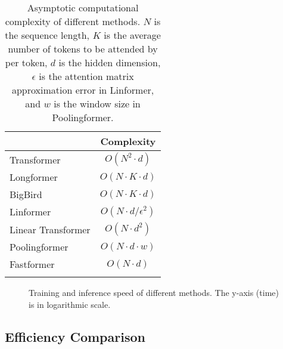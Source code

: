 \documentclass[11pt,a4paper]{article}
\begin{document}
\begin{table}[t]
\centering
\begin{tabular}{lc}
\Xhline{1.5pt}
\multicolumn{1}{c}{\textbf{Method}} & \multicolumn{1}{c}{\textbf{Complexity}} \\ \hline
Transformer                         & $O(N^2\cdot d)$                          \\
Longformer                          & $O(N\cdot K \cdot d)$                                             \\
BigBird                             & $O(N\cdot K \cdot d)$                                             \\
Linformer                             & $O(N \cdot d/\epsilon^2)$                                             \\
Linear Transformer                             & $O(N  \cdot d^2)$                                             \\
Poolingformer                             & $O(N\cdot d \cdot w)$                                             \\
Fastformer                      & $O(N\cdot d)$                         \\ \Xhline{1.5pt}
\end{tabular}
\caption{Asymptotic computational complexity of different methods. $N$ is the sequence length, $K$ is the average number of tokens to be attended by per token, $d$ is the hidden dimension, $\epsilon$ is the attention matrix approximation error in Linformer, and $w$ is the window size in Poolingformer.}\label{complexity}
\end{table}

\begin{figure*}[!t]
  \centering
  \caption{Training and inference speed of different methods. The y-axis (time) is in logarithmic scale.}\label{fig.speed}
\end{figure*}

\subsection{Efficiency Comparison}
\end{document}

